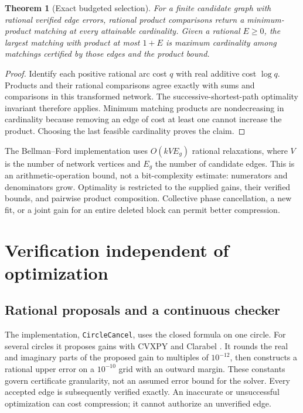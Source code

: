\documentclass[11pt]{article}
\newtheorem{theorem}{Theorem}[section]
\theoremstyle{definition}\newtheorem{definition}[theorem]{Definition}
\begin{document}
\begin{theorem}[Exact budgeted selection]\label{thm:matching}
For a finite candidate graph with rational verified edge errors, rational product comparisons return a minimum-product matching at every attainable cardinality. Given a rational $E\ge0$, the largest matching with product at most $1+E$ is maximum cardinality among matchings certified by those edges and the product bound.
\end{theorem}
\begin{proof}
Identify each positive rational arc cost $q$ with real additive cost $\log q$. Products and their rational comparisons agree exactly with sums and comparisons in this transformed network. The successive-shortest-path optimality invariant therefore applies. Minimum matching products are nondecreasing in cardinality because removing an edge of cost at least one cannot increase the product. Choosing the last feasible cardinality proves the claim.
\end{proof}

The Bellman--Ford implementation uses $O(kVE_g)$ rational relaxations, where $V$ is the number of network vertices and $E_g$ the number of candidate edges. This is an arithmetic-operation bound, not a bit-complexity estimate: numerators and denominators grow. Optimality is restricted to the supplied gains, their verified bounds, and pairwise product composition. Collective phase cancellation, a new fit, or a joint gain for an entire deleted block can permit better compression.

\section{Verification independent of optimization}
\subsection{Rational proposals and a continuous checker}
The implementation, \texttt{CircleCancel}, uses the closed formula on one circle. For several circles it proposes gains with CVXPY and Clarabel \cite{cvxpy}. It rounds the real and imaginary parts of the proposed gain to multiples of $10^{-12}$, then constructs a rational upper error on a $10^{-10}$ grid with an outward margin. These constants govern certificate granularity, not an assumed error bound for the solver. Every accepted edge is subsequently verified exactly. An inaccurate or unsuccessful optimization can cost compression; it cannot authorize an unverified edge.
\end{document}
